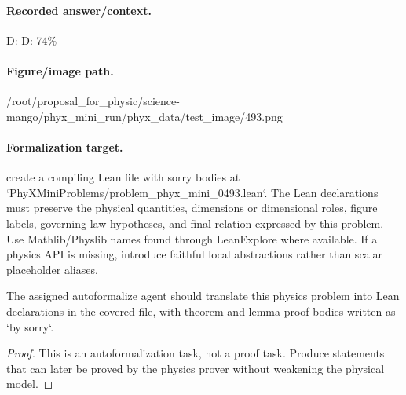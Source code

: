 \paragraph{Recorded answer/context.}
D: D: 74\%

\paragraph{Figure/image path.}
/root/proposal\_for\_physic/science-mango/phyx\_mini\_run/phyx\_data/test\_image/493.png

\paragraph{Formalization target.}
create a compiling Lean file with sorry bodies at `PhyXMiniProblems/problem\_phyx\_mini\_0493.lean`. The Lean declarations must preserve the physical quantities, dimensions or dimensional roles, figure labels, governing-law hypotheses, and final relation expressed by this problem.
Use Mathlib/Physlib names found through LeanExplore where available. If a physics API is missing, introduce faithful local abstractions rather than scalar placeholder aliases.

\begin{theorem}
\label{thm:physics:phyx_mini_0493:target}
The assigned autoformalize agent should translate this physics problem into Lean declarations in the covered file, with theorem and lemma proof bodies written as `by sorry`.
\end{theorem}
\begin{proof}
This is an autoformalization task, not a proof task. Produce statements that can later be proved by the physics prover without weakening the physical model.
\end{proof}

